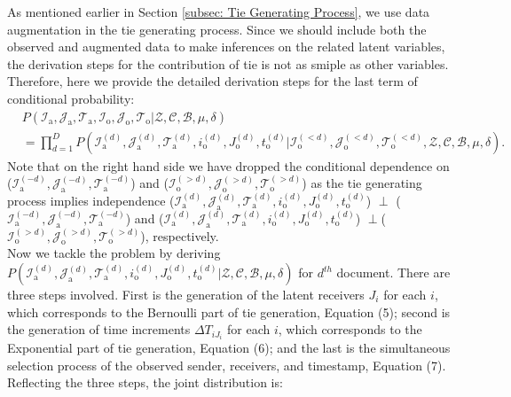 \documentclass[a4paper]{article}
\begin{document}
  As mentioned earlier in Section \ref{subsec: Tie Generating Process}, we use data augmentation in the tie generating process. Since we should include both the observed and augmented data to make inferences on the related latent variables, the derivation steps for the contribution of tie is not as smiple as other variables. Therefore, here we provide the detailed derivation steps for the last term of conditional probability: 
 \begin{equation}
\begin{aligned}
&P(\mathcal{I}_{\mbox{a}}, \mathcal{J}_{\mbox{a}}, \mathcal{T}_{\mbox{a}},\mathcal{I}_{\mbox{o}}, \mathcal{J}_{\mbox{o}}, \mathcal{T}_{\mbox{o}} |\mathcal{Z}, \mathcal{C}, \mathcal{B}, \mu, \delta)\\& = \prod_{d=1}^D P(\mathcal{I}^{(d)}_{\mbox{a}}, \mathcal{J}^{(d)}_{\mbox{a}}, \mathcal{T}^{(d)}_{\mbox{a}}, i^{(d)}_{\mbox{o}}, J^{(d)}_{\mbox{o}}, t^{(d)}_{\mbox{o}} |\mathcal{I}^{(<d)}_{\mbox{o}}, \mathcal{J}^{(<d)}_{\mbox{o}}, \mathcal{T}^{(<d)}_{\mbox{o}},\mathcal{Z}, \mathcal{C}, \mathcal{B}, \mu, \delta).
\end{aligned}
 \end{equation}
Note that on the right hand side we have dropped the conditional dependence on ($\mathcal{I}^{(-d)}_{\mbox{a}}, \mathcal{J}^{(-d)}_{\mbox{a}}, \mathcal{T}^{(-d)}_{\mbox{a}}$) and ($\mathcal{I}^{(>d)}_{\mbox{o}}, \mathcal{J}^{(>d)}_{\mbox{o}}, \mathcal{T}^{(>d)}_{\mbox{o}}$) as the tie generating process implies independence ($\mathcal{I}^{(d)}_{\mbox{a}}, \mathcal{J}^{(d)}_{\mbox{a}}, \mathcal{T}^{(d)}_{\mbox{a}}, i^{(d)}_{\mbox{o}}, J^{(d)}_{\mbox{o}}, t^{(d)}_{\mbox{o}}$) $\perp$ ($\mathcal{I}^{(-d)}_{\mbox{a}}, \mathcal{J}^{(-d)}_{\mbox{a}}, \mathcal{T}^{(-d)}_{\mbox{a}}$) and  ($\mathcal{I}^{(d)}_{\mbox{a}}, \mathcal{J}^{(d)}_{\mbox{a}}, \mathcal{T}^{(d)}_{\mbox{a}}, i^{(d)}_{\mbox{o}}, J^{(d)}_{\mbox{o}}, t^{(d)}_{\mbox{o}}$) $\perp$($\mathcal{I}^{(>d)}_{\mbox{o}}, \mathcal{J}^{(>d)}_{\mbox{o}}, \mathcal{T}^{(>d)}_{\mbox{o}}$), respectively. \\\newline  Now we tackle the problem by deriving $P(\mathcal{I}^{(d)}_{\mbox{a}}, \mathcal{J}^{(d)}_{\mbox{a}}, \mathcal{T}^{(d)}_{\mbox{a}}, i^{(d)}_{\mbox{o}}, J^{(d)}_{\mbox{o}}, t^{(d)}_{\mbox{o}} |\mathcal{Z}, \mathcal{C}, \mathcal{B}, \mu, \delta)$ for $d^{th}$ document. There are three steps involved. First is the generation of the latent receivers $J_i$ for each $i$, which corresponds to the Bernoulli part of tie generation, Equation (5); second is the generation of time increments $\Delta T_{iJ_i}$ for each $i$, which corresponds to the Exponential part of tie generation, Equation (6); and the last is the simultaneous selection process of the observed sender, receivers, and timestamp, Equation (7). Reflecting the three steps, the joint distribution is:\\
\end{document}
